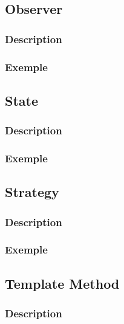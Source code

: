 \documentclass[french]{article}
\begin{document}
\subsection{Observer}

\subsubsection{Description}



\subsubsection{Exemple}



\subsection{State}

\subsubsection{Description}



\subsubsection{Exemple}



\subsection{Strategy}

\subsubsection{Description}



\subsubsection{Exemple}



\subsection{Template Method}

\subsubsection{Description}
\end{document}
